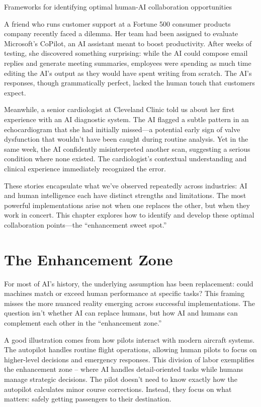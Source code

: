 \documentclass[
  Letterpaper,
]{scrbook}
\begin{document}
Frameworks for identifying optimal human-AI collaboration opportunities

\hfill\break

A friend who runs customer support at a Fortune 500 consumer products
company recently faced a dilemma. Her team had been assigned to evaluate
Microsoft's CoPilot, an AI assistant meant
to boost productivity. After weeks of testing, she discovered something
surprising: while the AI could compose email replies and generate
meeting summaries, employees were spending as much time editing the AI's
output as they would have spent writing from scratch. The AI's
responses, though grammatically perfect, lacked the human touch that
customers expect.

Meanwhile, a senior cardiologist at Cleveland Clinic told us about her
first experience with an AI diagnostic system. The AI flagged a subtle
pattern in an echocardiogram that she had initially missed---a potential
early sign of valve dysfunction that wouldn't have been caught during
routine analysis. Yet in the same week, the AI confidently
misinterpreted another scan, suggesting a serious condition where none
existed. The cardiologist's contextual
understanding and
clinical experience immediately recognized the error.

These stories encapsulate what we've observed repeatedly across
industries: AI and human intelligence each have distinct strengths and
limitations. The most powerful implementations arise not when one
replaces the other, but when they work in concert. This chapter explores
how to identify and develop these optimal collaboration points---the
``enhancement sweet spot.''

\section{The Enhancement Zone}\label{the-enhancement-zone}

For most of AI's history, the underlying assumption has been
replacement: could machines match or exceed human performance at
specific tasks? This framing misses the more nuanced reality emerging
across successful implementations. The question isn't whether AI can
replace humans, but how AI and humans can complement each other in the
``enhancement zone.''

A good illustration comes from how pilots interact with modern aircraft
systems. The autopilot handles routine flight operations, allowing human
pilots to focus on higher-level decisions and emergency responses. This
division of labor exemplifies the enhancement zone -- where AI handles
detail-oriented tasks while humans manage strategic decisions. The pilot
doesn't need to know exactly how the autopilot calculates minor course
corrections. Instead, they focus on what matters: safely getting
passengers to their destination.
\end{document}
